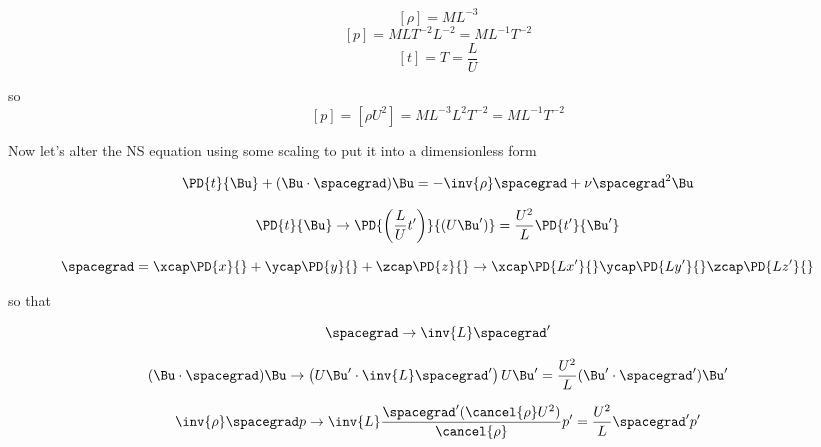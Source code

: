 \begin{equation}\label{eqn:continuumL14:230}
[\rho] = M L^{-3}
\end{equation}
\begin{equation}\label{eqn:continuumL14:250}
[p] = M L T^{-2} L^{-2} = M L^{-1} T^{-2}
\end{equation}
\begin{equation}\label{eqn:continuumL14:270}
[t] = T = \frac{L}{U}
\end{equation}

so 
\begin{equation}\label{eqn:continuumL14:290}
[p] = [\rho U^2] = M L^{-3} L^2 T^{-2}  = M L^{-1} T^{-2}
\end{equation}

Now let's alter the NS equation using some scaling to put it into a dimensionless form

\begin{equation}\label{eqn:continuumL14:310}
\PD{t}{\Bu} + (\Bu \cdot \spacegrad) \Bu = - \inv{\rho} \spacegrad + \nu \spacegrad^2 \Bu
\end{equation}

\begin{equation}\label{eqn:continuumL14:330}
\PD{t}{\Bu} \rightarrow  \PD{\left(\frac{L}{U} t'\right)}{(U \Bu')} = \frac{U^2}{L} \PD{t'}{\Bu'}
\end{equation}

\begin{equation}\label{eqn:continuumL14:350}
\spacegrad = 
\xcap \PD{x}{}
+\ycap \PD{y}{}
+\zcap \PD{z}{}
\rightarrow 
\xcap \PD{L x'}{}
\ycap \PD{L y'}{}
\zcap \PD{L z'}{}
\end{equation}

so that 

\begin{equation}\label{eqn:continuumL14:370}
\spacegrad \rightarrow \inv{L} \spacegrad'
\end{equation}

\begin{equation}\label{eqn:continuumL14:390}
(\Bu \cdot \spacegrad ) \Bu \rightarrow 
\left( U \Bu' \cdot \inv{L} \spacegrad' \right) U \Bu' = \frac{U^2}{L} (\Bu' \cdot \spacegrad') \Bu'
\end{equation}

\begin{equation}\label{eqn:continuumL14:410}
\inv{\rho} \spacegrad p \rightarrow \inv{L} \frac{\spacegrad' (\cancel{\rho} U^2) }{\cancel{\rho}} p' = \frac{U^2}{L} \spacegrad' p'
\end{equation}

